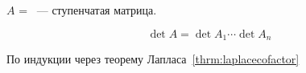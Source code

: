 \documentclass[12pt]{../../../notes}
\begin{document}
\begin{defn}\label{defn:stairsmtx}
  $A$ = ~--- ступенчатая 
  матрица.
\end{defn}
\begin{thrm}\label{thrm:stairsdet}
  \[
    \det A = \det A_1 \dotsm \det A_n
  \]
\end{thrm}
\begin{ittproof}
  По индукции через теорему Лапласа~\ref{thrm:laplacecofactor}
\end{ittproof}
\end{document}
